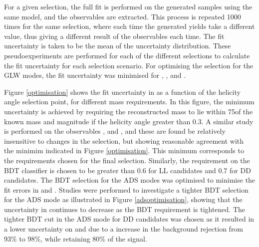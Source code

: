 For a given selection, the full \CP fit is performed on the generated samples using the same model, and the \CP observables are extracted. This process is repeated 1000 times for the same selection, where each time the generated yields take a different value, thus giving a different result of the \CP observables each time. The fit uncertainty is taken to be the mean of the uncertainty distribution. These pseudoexperiments are performed for each of the different selections to calculate the fit uncertainty for each selection scenario.  For optimising the selection for the GLW modes, the fit uncertainty was minimised for \Akk, \Rkk, \Apipi and \Rpipi. 

Figure \ref{optimisation} shows the fit uncertainty in \Rkk as a function of the \KS helicity angle selection point, for different \Kstar mass requirements. In this figure, the minimum uncertainty is achieved by requiring the reconstructed \Kstar mass to lie within 75\mevcc of the known \Kstar mass and magnitude if the \KS helicity angle greater than 0.3. A similar study is performed on the \CP observables \Akk, \Apipi and \Rpipi, and these are found be relatively insensitive to changes in the selection, but showing reasonable agreement with the minimim indicated in Figure \ref{optimisation}. This minimum corresponds to the \Kstar requirements chosen for the final selection. Similarly, the requirement on the BDT classifier is chosen to be greater than 0.6 for LL candidates and 0.7 for DD candidates. The BDT selection for the ADS modes was optimised to minimise the fit errors in \Rptwo and \Rmtwo. Studies were performed to investigate a tighter BDT selection for the ADS mode as illustrated in Figure \ref{adsoptimisation}, showing that the uncertainty in \Rptwo continues to decrease as the BDT requirement is tightened. The tighter BDT cut in the ADS mode for DD candidates was chosen as it resulted in a lower uncertainty on \Rptwo and \Rmtwo due to a increase in the background rejection from 93\% to 98\%, while retaining 80\% of the signal. 

